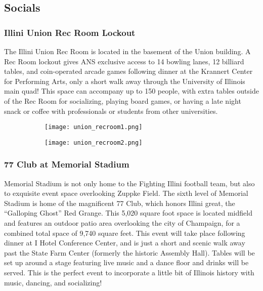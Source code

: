 \subsection{Socials}

\subsubsection{Illini Union Rec Room Lockout}
The Illini Union Rec Room is located in the basement of the Union building. A Rec Room lockout gives ANS exclusive access to 14 bowling lanes, 12 billiard tables, and coin-operated arcade games following dinner at the Krannert Center for Performing Arts, only a short walk away through the University of Illinois main quad! This space can accompany up to 150 people, with extra tables outside of the Rec Room for socializing, playing board games, or having a late night snack or coffee with professionals or students from other universities.

\begin{figure}[H]
	\centering
	\begin{subfigure}{0.5\textwidth}
		\centering
		\texttt{[image: union\_recroom1.png]}
	\end{subfigure}%
	\begin{subfigure}{0.5\textwidth}
		\centering
		\texttt{[image: union\_recroom2.png]}
	\end{subfigure}		
\end{figure} 

\subsubsection{77 Club at Memorial Stadium}
Memorial Stadium is not only home to the Fighting Illini football team, but also to exquisite event space overlooking Zuppke Field. The sixth level of Memorial Stadium is home of the magnificent 77 Club, which honors Illini great, the ``Galloping Ghost'' Red Grange. This 5,020 square foot space is located midfield and features an outdoor patio area overlooking the city of Champaign, for a combined total space of 9,740 square feet. This event will take place following dinner at I Hotel Conference Center, and is just a short and scenic walk away past the State Farm Center (formerly the historic Assembly Hall). Tables will be set up around a stage featuring live music and a dance floor and drinks will be served. This is the perfect event to incorporate a little bit of Illinois history with music, dancing, and socializing! 


